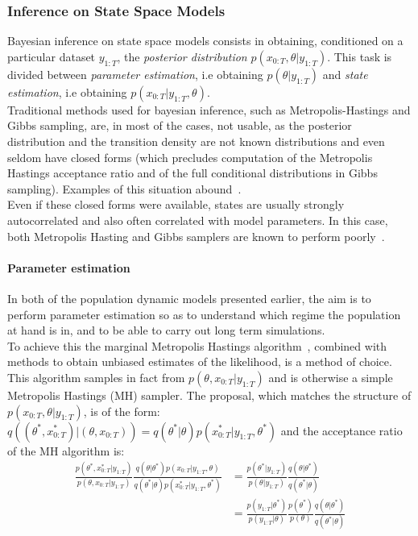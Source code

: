 \documentclass[12pt]{article}
\begin{document}
	\subsubsection{Inference on State Space Models}
	Bayesian inference on state space models consists in obtaining, conditioned on a particular dataset $y_{1:T}$, the \emph{posterior distribution} $p(x_{0:T}, \theta| y_{1:T})$. This task is divided between \emph{parameter estimation}, i.e obtaining $p(\theta | y_{1:T})$  and \emph{state estimation}, i.e obtaining $p(x_{0:T}|y_{1:T}, \theta)$. \\
	Traditional methods used for bayesian inference, such as Metropolis-Hastings and Gibbs sampling, are, in most of the cases, not usable, as the posterior distribution and the transition density are not known distributions and even seldom have closed forms (which precludes computation of the Metropolis Hastings acceptance ratio and of the full conditional distributions in Gibbs sampling). Examples of this situation abound~\cite{beskos2006exact, fearnhead2008particle, murray2011particle}.\\
	Even if these closed forms were available, states are usually strongly autocorrelated and also often correlated with model parameters. In this case, both Metropolis Hasting and Gibbs samplers are known to perform poorly~\cite{van2011partially}. \\

	
	\paragraph{Parameter estimation}
	In both of the population dynamic models presented earlier, the aim is to perform parameter estimation so as to understand which regime the population at hand is in, and to be able to carry out long term simulations. \\
	To achieve this the marginal Metropolis Hastings algorithm~\cite{hastings1970monte}, combined with methods to obtain unbiased estimates of the likelihood, is a method of choice. \\
	This algorithm samples in fact from $p(\theta, x_{0:T} | y_{1:T})$ and is otherwise a simple Metropolis Hastings (MH) sampler. The proposal, which matches the structure of $p(x_{0:T}, \theta | y_{1:T})$, is of the form: $q((\theta^*, x_{0:T}^*) | (\theta, x_{0:T})) = q(\theta^* | \theta)p(x_{0:T}^* | y_{1:T}, \theta^*)$ and the acceptance ratio of the MH algorithm is: 
	\begin{align*}
	\frac{p(\theta^*, x_{0:T}^* | y_{1:T})}{p(\theta, x_{0:T} | y_{1:T})}\frac{q(\theta | \theta^*)p(x_{0:T} | y_{1:T}, \theta)}{q(\theta^* | \theta)p(x_{0:T}^* | y_{1:T}, \theta^*)} & = \frac{p(\theta^* | y_{1:T})}{p(\theta | y_{1:T})}\frac{q(\theta | \theta^*)}{q(\theta^* | \theta)} \\
	& = \frac{p(y_{1:T} | \theta^*)}{p(y_{1:T}|\theta)}\frac{p(\theta^*)}{p(\theta)}\frac{q(\theta | \theta^*)}{q(\theta^* | \theta)}
	\end{align*}
	
\end{document}
